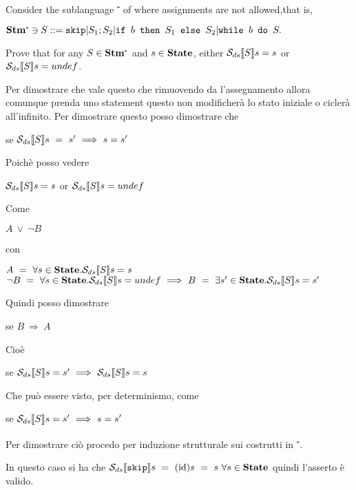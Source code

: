 \newcommand{\stmminus}{\stm{}\textsuperscript{\textbf{-}}}

{
    Consider the sublanguage \stmminus{} of \stm{} where assignments are not allowed,that is,
    \begin{center}
    $\stmminus{} \ni{} S ::= \skipistr | S_1;S_2 | \ifABC{b}{S_1}{S_2} | \wbS{b}{S}.$
    \end{center}
    Prove that for any $S\in\stmminus{}$ and $s\in\mbox{\textbf{State}}$, either $\mathcal{S}_{ds}\llbracket S \rrbracket{}s=s$ or $\mathcal{S}_{ds}\llbracket S \rrbracket{}s=undef$.
}
{
    Per dimostrare che vale questo che rimuovendo da \stm{} l'assegnamento
    allora comunque prenda uno statement questo non modificherà lo stato
    iniziale o ciclerà all'infinito. Per dimostrare questo posso dimostrare che 
    \begin{center}
    se $\mathcal{S}_{ds}\llbracket S \rrbracket{}s~=~s'~\Longrightarrow~s=s'$
    \end{center} 
    Poichè posso vedere 
    \begin{center}
    $\mathcal{S}_{ds}\llbracket S \rrbracket{}s=s$ or $\mathcal{S}_{ds}\llbracket S \rrbracket{}s=undef$
    \end{center}
    Come
    \begin{center}
    $A~\lor~\neg{}B$
    \end{center}
    con
    \begin{center}
    $A~=~\forall{}s\in\mbox{\textbf{State}}.\mathcal{S}_{ds}\llbracket S \rrbracket{}s=s$\\
    $\neg{}B~=~\forall{}s\in\mbox{\textbf{State}}.\mathcal{S}_{ds}\llbracket S \rrbracket{}s=undef~\Longrightarrow~B~=~
    \exists{}s'\in\mbox{\textbf{State}}.\mathcal{S}_{ds}\llbracket S \rrbracket{}s=s'$
    \end{center}
    Quindi posso dimostrare
    \begin{center}
    se $B~\Longrightarrow~A$
    \end{center}
    Cioè
    \begin{center}
    se $\mathcal{S}_{ds}\llbracket S \rrbracket{}s=s'~\Longrightarrow~\mathcal{S}_{ds}\llbracket S \rrbracket{}s=s$
    \end{center}
    Che può essere visto, per determinismo, come
    \begin{center}
    se $\mathcal{S}_{ds}\llbracket S \rrbracket{}s=s'~\Longrightarrow~s=s'$
    \end{center}
    Per dimostrare ciò procedo per induzione strutturale sui costrutti in 
    \stmminus{}.


     In questo caso si ha che $\mathcal{S}_{ds}\llbracket \textrm{\normalfont{\texttt{skip}}} \rrbracket s~
    =~(\textrm{\normalfont{id}})s~=~s~\forall{}s\in\mbox{\textbf{State}}$ quindi l'asserto è valido.

}
